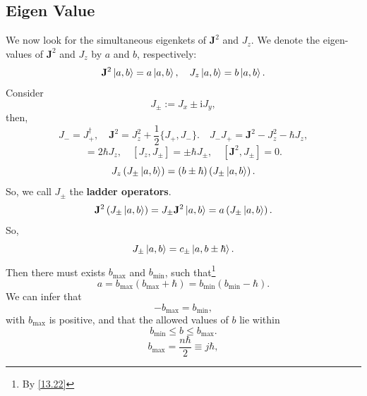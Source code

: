 \documentclass{article}
\theoremstyle{1}
\newcommand{\ii}{\mathrm{i}}
\begin{document}
\subsection{Eigen Value}
We now look for the simultaneous eigenkets of $\mathbf{J}^2$ and $J_z$. We denote the eigen-values of $\mathbf{J}^2$ and $J_z$ by $a$ and $b$, respectively:
\begin{equation}
    \mathbf{J}^2\ket{a,b}=a\ket{a,b},\quad J_z\ket{a,b}=b\ket{a,b}.
\end{equation}
Consider
\begin{equation}
    J_\pm:=J_x\pm \ii  J_y,
\end{equation}
then, 
\begin{equation}\label{13.22}
    J_-=J_+^\dagger, \quad \mathbf{J}^2=J_z^2+\frac{1}{2}\{J_+,J_-\}.\quad J_-J_+ =\mathbf{J}^2- J_z^2 -\hbar J_z,
\end{equation}
\begin{equation}
    [J_+,J_-]=2\hbar J_z,\quad [J_z,J_\pm]=\pm\hbar J_\pm,\quad [\mathbf{J}^2,J_\pm]=0.
\end{equation}
\begin{equation}
    J_z\left(J_\pm\ket{a,b}\right)=\left(b\pm\hbar\right)\left( J_\pm\ket{a,b}\right).
\end{equation}
So, we call $J_\pm$ the \textbf{ladder operators}.
\begin{equation}
    \mathbf{J}^2\left(J_\pm\ket{a,b}\right)=J_\pm \mathbf{J}^2\ket{a,b}=a\left(J_\pm\ket{a,b}\right).
\end{equation}
So, 
\begin{equation}
    J_\pm\ket{a,b}=c_\pm\ket{a,b\pm \hbar}.
\end{equation}
Then there must exists $b_\mathrm{max}$ and $b_\mathrm{min}$, such that\footnote{By \eqref{13.22}} 
\begin{equation}
    a=b_\mathrm{max}\left(b_\mathrm{max}+\hbar\right)=b_\mathrm{min}\left(b_\mathrm{min}-\hbar\right).
\end{equation}
We can infer that 
\begin{equation}
   - b_\mathrm{max}=b_\mathrm{min},
\end{equation}
with $b_\mathrm{max}$ is positive, and that the allowed values of $b$ lie within
\begin{equation}
    b_\mathrm{min}\le b\le b_\mathrm{max}.
\end{equation}
\begin{equation}
    b_\mathrm{max}=\frac{n\hbar}{2}\equiv j\hbar,
\end{equation}
\end{document}
